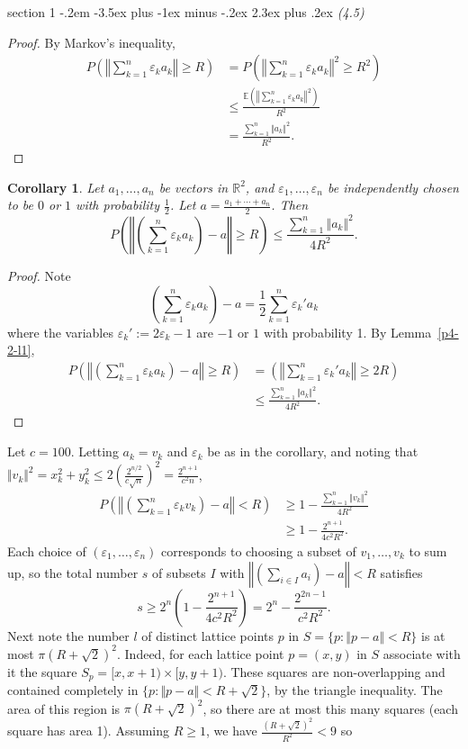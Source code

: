 \documentclass[12pt]{article}
\makeatletter
\theoremstyle{norm}
\newtheorem{cor}[thm]{Corollary}
\newcommand{\E}[0]{\mathbb{E}}
\newcommand{\R}[0]{\mathbb{R}}
\newcommand{\rc}[1]{\frac{1}{#1}}
\newcommand{\ep}[0]{\varepsilon}
\newcommand{\la}[0]{\lambda}
\newcommand{\pa}[1]{\left( {#1} \right)}
\newcommand{\pf}[2]{\pa{\frac{#1}{#2}}}
\newenvironment{problem}{\@startsection
       {section}
       {1}
       {-.2em}
       {-3.5ex plus -1ex minus -.2ex}
       {2.3ex plus .2ex}
       {\pagebreak[3]%
       \large\bf\noindent{Problem }
       }
       }
       {%
       }
\makeatother
\begin{document}
\begin{problem}{\it (4.5)}
\begin{proof}
By Markov's inequality,
\begin{align*}P\pa{\left\Vert\sum_{k=1}^n \ep_ka_k\right\Vert\ge R}&=
P\pa{\left\Vert\sum_{k=1}^n \ep_ka_k\right\Vert^2\ge R^2}\\
&\le \frac{\E\pa{\left\Vert\sum_{k=1}^n \ep_ka_k\right\Vert^2}}{R^2}\\
&=\frac{\sum_{k=1}^n \Vert a_k\Vert^2}{R^2}.
\end{align*}
\end{proof}
\begin{cor}\label{p4-2-c2}
Let $a_1,\ldots, a_n$ be vectors in $\R^2$, and $\ep_1,\ldots, \ep_n$ be independently chosen to be $0$ or $1$ with probability $\rc2$. 
Let $a=\frac{a_1+\cdots +a_n}{2}$. 
Then
\[
P\pa{\left\Vert\pa{\sum_{k=1}^n \ep_ka_k}-a\right\Vert\ge R}\le\frac{\sum_{k=1}^n \Vert a_k\Vert^2}{4R^2}. 
\]
\end{cor}
\begin{proof}
Note
\[\pa{\sum_{k=1}^n \ep_ka_k}-a=\rc{2}\sum_{k=1}^n\ep_k'a_k\]
where the variables $\ep_k':=2\ep_k-1$ are $-1$ or $1$ with probability 1. By Lemma~\ref{p4-2-l1}, 
\begin{align*}
P\pa{\left\Vert\pa{\sum_{k=1}^n \ep_ka_k}-a\right\Vert\ge R}
&=\pa{\left\Vert\sum_{k=1}^n\ep_k'a_k\right\Vert\ge 2R}\\
&\le \frac{\sum_{k=1}^n \Vert a_k\Vert^2}{4R^2}.
\end{align*}
\end{proof}
Let $c=100$. Letting $a_k=v_k$ and $\ep_k$ be as in the corollary, and noting that $\Vert v_k\Vert^2=x_k^2+y_k^2\le 2\pf{2^{n/2}}{c\sqrt n}^2=\frac{2^{n+1}}{c^2n}$, 
\begin{align*}
P\pa{\left\Vert\pa{\sum_{k=1}^n \ep_kv_k}-a\right\Vert< R}
&\ge 1-\frac{\sum_{k=1}^n \Vert v_k\Vert^2}{4R^2}\\
&\ge 1-\frac{2^{n+1}}{4c^2R^2}.
\end{align*}
Each choice of $(\ep_1,\ldots, \ep_n)$ corresponds to choosing a subset of $v_1,\ldots, v_k$ to sum up, so the total number $s$ of subsets $I$ with $\left\Vert\pa{\sum_{i\in I} a_i}-a\right\Vert<R$ satisfies
\begin{equation}\label{p4-2-1}
s\geq 2^n\pa{1-\frac{2^{n+1}}{4c^2R^2}}=2^n-\frac{2^{2n-1}}{c^2 R^2}.
\end{equation}
Next note the number $l$ of distinct lattice points $p$ in $S=\{p:\Vert p-a\Vert<R\}$ is at most $\pi(R+\sqrt 2)^2$. Indeed, for each lattice point $p=(x,y)$ in $S$ associate with it the square $S_p=[x,x+1)\times [y,y+1)$. These squares are non-overlapping and contained completely in $\{p:\Vert p-a\Vert<R+\sqrt 2\}$, by the triangle inequality. The area of this region is $\pi(R+\sqrt 2)^2$, so there are at most this many squares (each square has area 1). Assuming $R\ge 1$, we have $\frac{(R+\sqrt 2)^2}{R^2}<9$ so

\end{problem}
\end{document}
